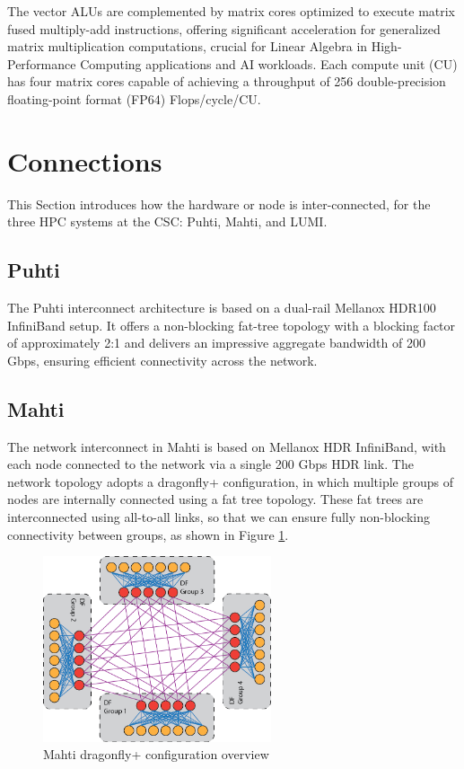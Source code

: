 The vector ALUs are complemented by matrix cores optimized to execute matrix fused multiply-add instructions, offering significant acceleration for generalized matrix multiplication computations, crucial for Linear Algebra in High-Performance Computing applications and AI workloads. Each compute unit (CU) has four matrix cores capable of achieving a throughput of 256 double-precision floating-point format (FP64) Flops/cycle/CU.

\section{Connections}
This Section introduces how the hardware or node is inter-connected, for the three HPC systems at the CSC: Puhti, Mahti, and LUMI.

\subsection{Puhti}
The Puhti\cite{puhti} interconnect architecture is based on a dual-rail Mellanox HDR100 InfiniBand setup. It offers a non-blocking fat-tree topology with a blocking factor of approximately 2:1 and delivers an impressive aggregate bandwidth of 200 Gbps, ensuring efficient connectivity across the network.

\subsection{Mahti}
The network interconnect in Mahti is based on Mellanox HDR InfiniBand, with each node connected to the network via a single 200 Gbps HDR link. The network topology adopts a dragonfly+ configuration, in which multiple groups of nodes are internally connected using a fat tree topology. These fat trees are interconnected using all-to-all links, so that we can ensure fully non-blocking connectivity between groups, as shown in Figure \ref{fig_mahti_df_ex}.

\begin{figure}[H]
    \centering
    \includegraphics[width=0.6\textwidth]{figures/mahti_df_ex.png}
    \caption{Mahti dragonfly+ configuration overview \cite{mahti}}
    \label{fig_mahti_df_ex}
\end{figure}

